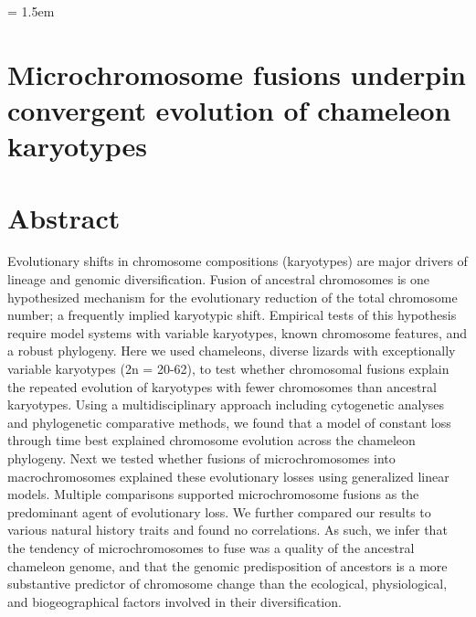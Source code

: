 \documentclass[a4paper, 12pt]{article}
\begin{document}
\modulolinenumbers[1]   %


\parindent = 1.5em
\addtolength{\parskip}{.9em}

\raggedright


\section{Microchromosome fusions underpin convergent evolution of chameleon karyotypes}


\section{Abstract}

Evolutionary shifts in chromosome compositions (karyotypes) are major drivers of lineage and genomic diversification. 
Fusion of ancestral chromosomes is one hypothesized mechanism for the evolutionary reduction of the total chromosome number; a frequently implied karyotypic shift. 
Empirical tests of this hypothesis require model systems with variable karyotypes, known chromosome features, and a robust phylogeny. 
Here we used chameleons, diverse lizards with exceptionally variable karyotypes (2n = 20-62), to test whether chromosomal fusions explain the repeated evolution of karyotypes with fewer chromosomes than ancestral karyotypes. 
Using a multidisciplinary approach including cytogenetic analyses and phylogenetic comparative methods, we found that a model of constant loss through time best explained chromosome evolution across the chameleon phylogeny. 
Next we tested whether fusions of microchromosomes into macrochromosomes explained these evolutionary losses using generalized linear models. 
Multiple comparisons supported microchromosome fusions as the predominant agent of evolutionary loss. 
We further compared our results to various natural history traits and found no correlations. 
As such, we infer that the tendency of microchromosomes to fuse was a quality of the ancestral chameleon genome, and that the genomic predisposition of ancestors is a more substantive predictor of chromosome change than the ecological, physiological, and biogeographical factors involved in their diversification.
\end{document}
